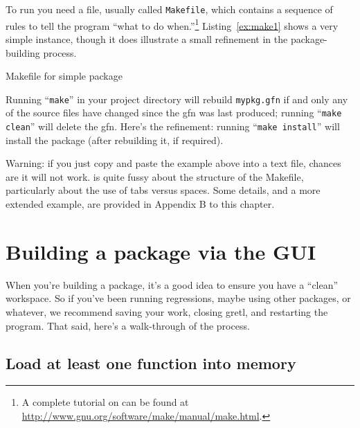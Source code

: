 \documentclass[oneside]{book}
\begin{document}
To run  you need a file, usually called \texttt{Makefile},
which contains a sequence of rules to tell the program ``what to do
when.''\footnote{A complete tutorial on  can be found at
  \url{http://www.gnu.org/software/make/manual/make.html}.}
Listing~\ref{ex:make1} shows a very simple instance, though it does
illustrate a small refinement in the package-building process.

\begin{script}[htbp]
  \caption{Makefile for simple package}
  \label{ex:make1}
\end{script}

Running ``\texttt{make}'' in your project directory will rebuild
\texttt{mypkg.gfn} if and only any of the source files have changed
since the \textsf{gfn} was last produced; running ``\texttt{make
  clean}'' will delete the \textsf{gfn}. Here's the refinement:
running ``\texttt{make install}'' will install the package (after
rebuilding it, if required).

Warning: if you just copy and paste the example above into a text
file, chances are it will not work.  is quite fussy about
the structure of the Makefile, particularly about the use of tabs
versus spaces. Some details, and a more extended example, are provided
in Appendix B to this chapter.

\section{Building a package via the GUI}
\label{sec:gui-build}

When you're building a package, it's a good idea to ensure you have a
``clean'' workspace. So if you've been running regressions, maybe
using other packages, or whatever, we recommend saving your work,
closing gretl, and restarting the program.  That said, here's a
walk-through of the process.

\subsection{Load at least one function into memory}
\end{document}
